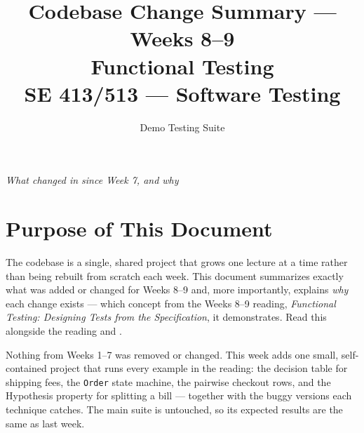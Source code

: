 \documentclass[11pt]{article}
\title{
  \textbf{Codebase Change Summary --- Weeks 8--9}\\[4pt]
  \large Functional Testing\\[2pt]
  \normalsize SE 413/513 --- Software Testing
}
\author{Demo Testing Suite}
\date{}
\begin{document}
\maketitle

\begin{center}
\textit{What changed in  since Week 7, and why}
\end{center}

\vspace{0.3cm}

\section{Purpose of This Document}
The  codebase is a single, shared project that
grows one lecture at a time rather than being rebuilt from scratch each
week. This document summarizes exactly what was added or changed for
Weeks 8--9 and, more importantly, explains \emph{why} each change exists ---
which concept from the Weeks 8--9 reading, \textit{Functional Testing:
Designing Tests from the Specification}, it demonstrates. Read this
alongside the reading and .

\begin{keyidea}
Nothing from Weeks 1--7 was removed or changed. This week adds one
small, self-contained project that runs every example in the reading:
the decision table for shipping fees, the \texttt{Order} state machine,
the pairwise checkout rows, and the Hypothesis property for splitting a
bill --- together with the buggy versions each technique catches. The
main suite is untouched, so its expected results are the same as last
week.
\end{keyidea}

\end{document}
